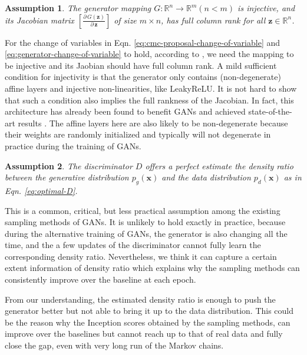 \documentclass{article} %
\newcommand{\bx}{\mathbf{x}}
\newcommand{\bz}{\mathbf{z}}
\newcommand{\bbR}{\mathbb{R}}
\newcommand{\<}{\left\langle}
\renewcommand{\>}{\right\rangle}
\newtheorem{assumption}{Assumption}
\begin{document}
\begin{assumption}
The generator mapping $G:\bbR^n\to\bbR^m (n<m)$ is injective, and its Jacobian matrix $\left[\frac{\partial\,G(\bz)}{\partial\,\bz}\right]$ of size $m\times n$, has full column rank for all $\bz\in\bbR^n$.
\end{assumption}
For the change of variables in Eqn. \eqref{eq:cmc-proposal-change-of-variable} and \eqref{eq:generator-change-of-variable} to hold, according to \cite{ben1999change}, we need the mapping to be injective and its Jaobian should have full column rank. A mild sufficient condition for injectivity is that the generator only contains (non-degenerate) affine layers and injective non-linearities, like LeakyReLU. It is not hard to show that such a condition also implies the full rankness of the Jacobian. In fact, this architecture has already been found to benefit GANs and achieved state-of-the-art results \citep{tang2020lessons}. The affine layers here are also likely to be non-degenerate because their weights are randomly initialized and typically will not degenerate in practice during the training of GANs.


\begin{assumption}
The discriminator $D$ offers a perfect estimate the density ratio between the generative distribution $p_g(\bx)$ and the data distribution $p_d(\bx)$ as in Eqn. \eqref{eq:optimal-D}.
\end{assumption}

This is a common, critical, but less practical assumption among the existing sampling methods of GANs. It is unlikely to hold exactly in practice, because during the alternative training of GANs, the generator is also changing all the time, and the a few updates of the discriminator cannot fully learn the corresponding density ratio. Nevertheless, we think it can capture a certain extent information of density ratio which explains why the sampling methods can consistently improve over the baseline at each epoch. 

From our understanding, the estimated density ratio is enough to push the generator better but not able to bring it up to the data distribution. This could be the reason why the Inception scores obtained by the sampling methods, can improve over the baselines but cannot reach up to that of real data and fully close the gap, even with very long run of the Markov chains.
\end{document}
